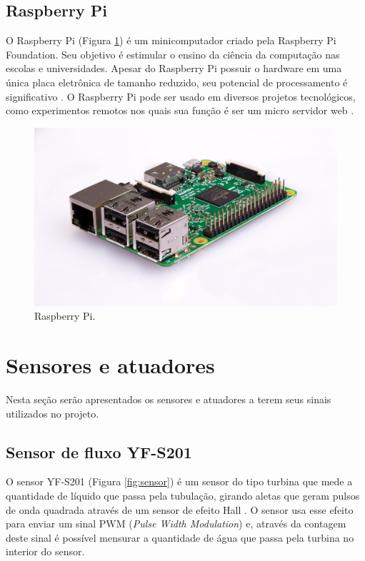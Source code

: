 \subsection{Raspberry Pi}

O Raspberry Pi (Figura \ref{fig:rpi}) é um minicomputador criado pela Raspberry Pi Foundation. Seu objetivo é estimular o ensino da ciência da computação nas escolas e universidades. Apesar do Raspberry Pi possuir o hardware em uma única placa eletrônica de tamanho reduzido, seu potencial de processamento é significativo \cite{crotti2013raspberrypi}. O Raspberry Pi pode ser usado em diversos projetos tecnológicos, como experimentos remotos nos quais sua função é ser um micro servidor web \cite{crotti2013raspberrypi}.

\begin{figure}[htbp]
		\centering
		\includegraphics[scale=0.2]{figuras/raspberrypi.jpg}
		\caption{Raspberry Pi.}
		\label{fig:rpi}
\end{figure}

\section{Sensores e atuadores}

Nesta seção serão apresentados os sensores e atuadores a terem seus sinais utilizados no projeto. 

\subsection{Sensor de fluxo YF-S201} \label{sec:sensor}

O sensor YF-S201 (Figura \ref{fig:sensor}) é um sensor do tipo turbina que mede a quantidade de líquido que passa pela tubulação, girando aletas que
geram pulsos de onda quadrada através de um sensor de efeito Hall \cite{roque2018sistema}. O
sensor usa esse efeito para enviar um sinal PWM (\textit{Pulse Width Modulation}) e, através da contagem deste sinal é possível mensurar a quantidade de água que passa pela turbina no interior do sensor. \cite{ms2017automaccao}

